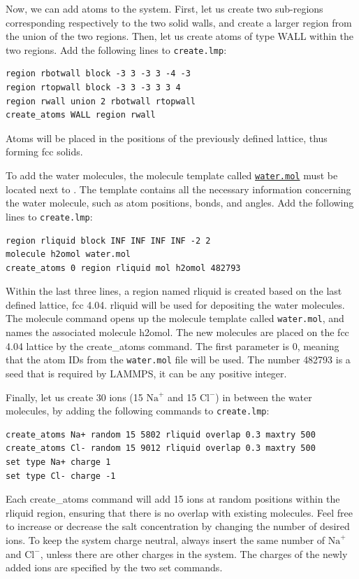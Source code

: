 \documentclass[9pt,tutorial]{livecoms}
\newcommand{\lmpcmd}[1]{\hspace{0pt}\colorbox{listing}{\textcolor{command}{\small{#1}}}\hspace{0pt}} %
\newcommand{\flecmd}[1]{\textcolor{command}{\texttt{#1}}} %
\newcommand{\dwlcmd}[1]{\textcolor{download}{\texttt{#1}}} %
\newcommand{\filepath}{https://raw.githubusercontent.com/lammpstutorials/lammpstutorials-article/main/files/}
\begin{document}
Now, we can add atoms to the system.  First, let us create two sub-regions corresponding
respectively to the two solid walls, and create a larger region from the union of the
two regions.  Then, let us create atoms of type WALL within the two regions.  Add the
following lines to \flecmd{create.lmp}:
\begin{lstlisting}
region rbotwall block -3 3 -3 3 -4 -3
region rtopwall block -3 3 -3 3 3 4
region rwall union 2 rbotwall rtopwall
create_atoms WALL region rwall
\end{lstlisting}
Atoms will be placed in the positions of the previously defined lattice, thus
forming fcc solids.

To add the water molecules, the molecule
template called \href{\filepath tutorial4/water.mol}{\dwlcmd{water.mol}}
must be located next to \flecmd{}.  The template contains all the
necessary information concerning the water molecule, such as atom positions,
bonds, and angles.  Add the following lines to \flecmd{create.lmp}:
\begin{lstlisting}
region rliquid block INF INF INF INF -2 2
molecule h2omol water.mol
create_atoms 0 region rliquid mol h2omol 482793
\end{lstlisting}
Within the last three lines, a \lmpcmd{region} named \lmpcmd{rliquid} is
created based on the last defined lattice, \lmpcmd{fcc 4.04}.  \lmpcmd{rliquid}
will be used for depositing the water molecules.  The \lmpcmd{molecule} command
opens up the molecule template called \flecmd{water.mol}, and names the
associated molecule \lmpcmd{h2omol}.  The new molecules are placed on the
\lmpcmd{fcc 4.04} lattice by the \lmpcmd{create\_atoms} command.  The first
parameter is 0, meaning that the atom IDs from the \flecmd{water.mol} file
will be used.  The number \lmpcmd{482793} is a seed that is required by LAMMPS,
it can be any positive integer.

Finally, let us create 30 ions (15 $\text{Na}^+$ and 15 $\text{Cl}^-$) in between
the water molecules, by adding the following commands to \flecmd{create.lmp}:
\begin{lstlisting}
create_atoms Na+ random 15 5802 rliquid overlap 0.3 maxtry 500
create_atoms Cl- random 15 9012 rliquid overlap 0.3 maxtry 500
set type Na+ charge 1
set type Cl- charge -1
\end{lstlisting}
Each \lmpcmd{create\_atoms} command will add 15 ions at random positions
within the \lmpcmd{rliquid} region, ensuring that there is no \lmpcmd{overlap}
with existing molecules.  Feel free to increase or decrease the salt concentration
by changing the number of desired ions.  To keep the system charge neutral,
always insert the same number of $\text{Na}^+$ and $\text{Cl}^-$, unless there
are other charges in the system.  The charges of the newly added ions are specified
by the two \lmpcmd{set} commands.
\end{document}
